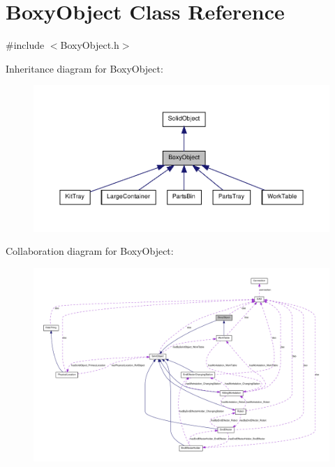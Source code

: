 \hypertarget{class_boxy_object}{
\section{BoxyObject Class Reference}
\label{class_boxy_object}
}


{\ttfamily \#include $<$BoxyObject.h$>$}



Inheritance diagram for BoxyObject:\nopagebreak
\begin{figure}[H]
\begin{center}
\leavevmode
\includegraphics[width=400pt]{class_boxy_object__inherit__graph}
\end{center}
\end{figure}


Collaboration diagram for BoxyObject:\nopagebreak
\begin{figure}[H]
\begin{center}
\leavevmode
\includegraphics[width=400pt]{class_boxy_object__coll__graph}
\end{center}
\end{figure}
